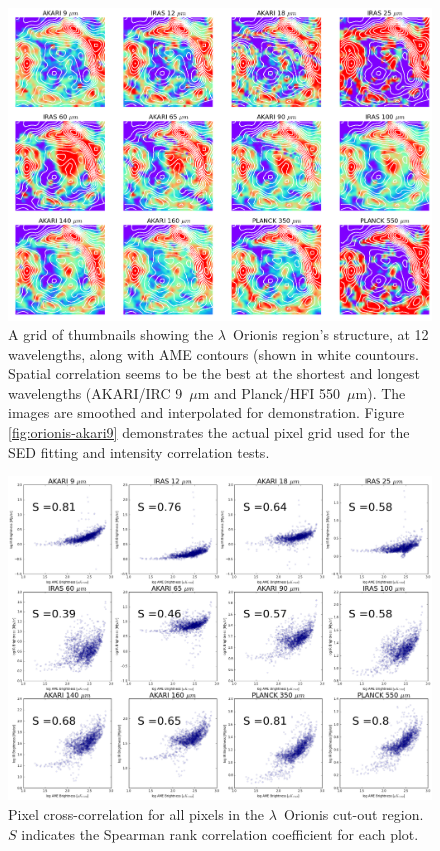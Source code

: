 \begin{figure}
  \label{fig:orionis-img}
  \includegraphics[width=170mm]{../Plots/lOrionis_grid_img.png}
  \centering
  \caption{A grid of thumbnails showing the $\lambda$~Orionis region's structure, at 12 wavelengths, along with AME contours (shown in white countours. Spatial correlation seems to be the best at the shortest and longest wavelengths (AKARI/IRC 9~$\mu$m and Planck/HFI 550~$\mu$m). The images are smoothed and interpolated for demonstration. Figure \ref{fig:orionis-akari9} demonstrates the actual pixel grid used for the SED fitting and intensity correlation tests.}
\end{figure}

\begin{figure}
  \label{fig:orionis-corr}
  \includegraphics[width=170mm]{../Plots/orionis_correlations_AME.png}
  \centering
  \caption{Pixel cross-correlation for all pixels in the $\lambda$~Orionis cut-out region.  $S$ indicates the Spearman rank correlation coefficient for each plot.}
\end{figure}

